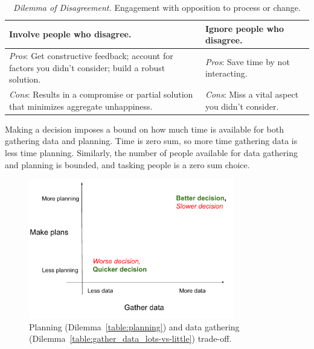 \begin{center}
\begin{table}[H]
\begin{tabular}{ | m{\dilemmatablewidth}| m{\dilemmatablewidth} | } 
  \hline
  \textbf{Involve people who disagree.} & 
  \textbf{Ignore people who disagree.} \\ 
  \hline
  \textit{Pros}: Get constructive feedback; account for factors you didn't consider; build a robust solution. & 
  \textit{Pros}: Save time by not interacting. \\  
  \hline
  \textit{Cons}: Results in a compromise or partial solution that minimizes aggregate unhappiness. & 
  \textit{Cons}: Miss a vital aspect you didn't consider. \\  
  \hline
\end{tabular}
\caption{\textit{Dilemma of Disagreement.}
Engagement with opposition to process or change.
}
\label{table:opposition}
\end{table}
\end{center}

Making a decision imposes a bound on how much time is available for both gathering data and planning. Time is zero sum, so more time gathering data is less time planning. Similarly, the number of people available for data gathering and planning is bounded, and tasking people is a zero sum choice.

\begin{figure}[H] %
    \centering
    \includegraphics[width=0.8\textwidth]{images/planning_and_data_gathering.pdf}
    \caption{Planning (Dilemma~\ref{table:planning}) and data gathering (Dilemma~\ref{table:gather_data_lots-vs-little}) trade-off.}
    \label{fig:pareto_frontier}
\end{figure}

